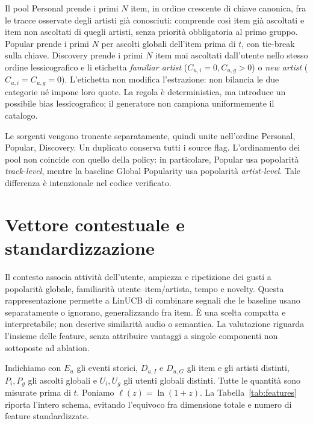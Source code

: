 Il pool Personal prende i primi $N$ item, in ordine crescente di chiave canonica, fra le tracce osservate degli artisti già conosciuti: comprende così item già ascoltati e item non ascoltati di quegli artisti, senza priorità obbligatoria al primo gruppo. Popular prende i primi $N$ per ascolti globali dell'item prima di $t$, con tie-break sulla chiave. Discovery prende i primi $N$ item mai ascoltati dall'utente nello stesso ordine lessicografico e li etichetta \emph{familiar artist} ($C_{u,i}=0,C_{u,g}>0$) o \emph{new artist} ($C_{u,i}=C_{u,g}=0$). L'etichetta non modifica l'estrazione: non bilancia le due categorie né impone loro quote. La regola è deterministica, ma introduce un possibile bias lessicografico; il generatore non campiona uniformemente il catalogo.

Le sorgenti vengono troncate separatamente, quindi unite nell'ordine Personal, Popular, Discovery. Un duplicato conserva tutti i source flag. L'ordinamento dei pool non coincide con quello della policy: in particolare, Popular usa popolarità \emph{track-level}, mentre la baseline Global Popularity usa popolarità \emph{artist-level}. Tale differenza è intenzionale nel codice verificato.

\section{Vettore contestuale e standardizzazione}\label{sec:features}
Il contesto associa attività dell'utente, ampiezza e ripetizione dei gusti a popolarità globale, familiarità utente--item/artista, tempo e novelty. Questa rappresentazione permette a LinUCB di combinare segnali che le baseline usano separatamente o ignorano, generalizzando fra item. È una scelta compatta e interpretabile; non descrive similarità audio o semantica. La valutazione riguarda l'insieme delle feature, senza attribuire vantaggi a singole componenti non sottoposte ad ablation.

Indichiamo con $E_u$ gli eventi storici, $D_{u,I}$ e $D_{u,G}$ gli item e gli artisti distinti, $P_i,P_g$ gli ascolti globali e $U_i,U_g$ gli utenti globali distinti. Tutte le quantità sono misurate prima di $t$. Poniamo $\ell(z)=\ln(1+z)$. La Tabella~\ref{tab:features} riporta l'intero schema, evitando l'equivoco fra dimensione totale e numero di feature standardizzate.

